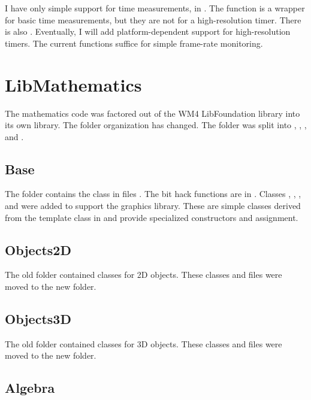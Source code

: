 \documentclass{article}
\begin{document}
I have only simple support for time measurements, in .  The function
 is a wrapper for basic time measurements, but they are
not for a high-resolution timer.  There is also .  Eventually,
I will add platform-dependent support for high-resolution timers.  The current
functions suffice for simple frame-rate monitoring.

\section{LibMathematics}

The mathematics code was factored out of the WM4 LibFoundation library into its
own library.  The folder organization has changed.  The 
folder was split into , ,
, and .

\subsection{Base}

The  folder contains the  class in files .
The bit hack functions are in .   Classes , ,
, and  were added to support the graphics library.
These are simple classes derived from the  template class in
 and provide specialized constructors and assignment.

\subsection{Objects2D}

The old  folder contained classes for 2D objects.  These
classes and files were moved to the new  folder.

\subsection{Objects3D}

The old  folder contained classes for 3D objects.  These
classes and files were moved to the new  folder.

\subsection{Algebra}
\end{document}
